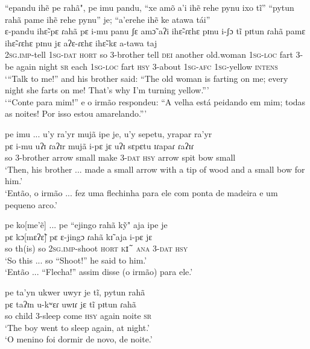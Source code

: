 \documentclass[output=paper,
modfonts,nonflat
]{langsci/langscibook}
\begin{document}
\ea “epandu ihẽ pe rahã", pe imu pandu, “xe amõ a'i ihẽ rehe pynu ixo tĩ” “pytun rahã pame ihẽ rehe pynu” je; “a'erehe ihẽ ke atawa tái” \\[.3em]
\gll ɛ-pandu ihɛ̃-pɛ ɾahã pɛ i-mu panu ʃɛ amɔ̃ aʔi ihɛ̃-ɾɛhɛ pɪnu i-ʃɔ tĩ pɪtun ɾahã pamɛ ihɛ̃-ɾɛhɛ pɪnu jɛ aʔɛ-ɾɛhɛ ihɛ̃-kɛ a-tawa taj \\
\textsc{2sg.imp}-tell \textsc{1sg-dat} \textsc{hort} so 3-brother tell \textsc{dei} another old.woman \textsc{1sg-loc} fart 3-be again night \textsc{sr} each \textsc{1sg-loc} fart \textsc{hsy} 3-about \textsc{1sg-afc} \textsc{1sg}-yellow \textsc{intens} \\
\glt ‘“Talk to me!” and his brother said: “The old woman is farting on me; every night she farts on me! That's why I'm turning yellow.”’ \\
‘“Conte para mim!” e o irmão respondeu: “A velha está peidando em mim; todas as noites! Por isso estou amarelando.”’ \\
\z

\ea pe imu ... u'y ra'yr mujã ipe je, u'y sepetu, yrapar ra'yr \\[.3em]
\gll pɛ i-mu uʔɪ ɾaʔɪr mujã i-pɛ jɛ uʔɪ sɛpɛtu ɪɾapaɾ ɾaʔɪɾ \\
so 3-brother arrow small make 3-\textsc{dat} \textsc{hsy} arrow spit bow small \\
\glt ‘Then, his brother ... made a small arrow with a tip of wood and a small bow  for him.’ \\
‘Então, o irmão ... fez uma flechinha para ele com ponta de madeira e um pequeno arco.’ \\
\z

\ea pe ko[me'ẽ] ... pe “ejingo rahã kỹ" aja ipe je \\[.3em]
\gll pɛ kɔ[mɛʔɛ̃] pɛ ɛ-jingɔ ɾahã kɪ̃ aja i-pɛ jɛ \\
so th(is) so \textsc{2sg.imp}-shoot \textsc{hort} \textsc{kɪ̃}\footnotemark{} \textsc{ana} 3-\textsc{dat} \textsc{hsy} \\
\glt ‘So this ... so “Shoot!” he said to him.’ \\
‘Então ... “Flecha!” assim disse (o irmão) para ele.’ \\ 
\z

\ea pe ta'yn ukwer uwyr je tĩ, pytun rahã  \\[.3em]
\gll pɛ taʔɪn u-kʷɛɾ uwɪɾ jɛ tĩ pɪtun ɾahã \\
so child 3-sleep come \textsc{hsy} again noite \textsc{sr} \\
\glt ‘The boy went to sleep again, at night.’ \\
‘O menino foi dormir de novo, de noite.’ \\
\z
\end{document}
